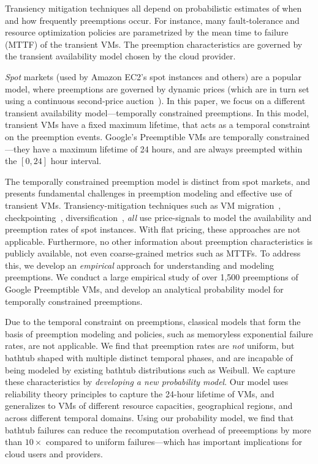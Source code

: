 Transiency mitigation techniques all depend on probabilistic estimates of when and how frequently preemptions occur.
%
For instance, many fault-tolerance and resource optimization policies are parametrized by the mean time to failure (MTTF) of the transient VMs. 
%
The preemption characteristics are governed by the transient availability model chosen by the cloud provider.


%
\emph{Spot} markets (used by Amazon EC2's spot instances and others) are a popular model, where preemptions are governed by dynamic prices (which are in turn set using a continuous second-price auction~\cite{spot-pricing2}). 
%
In this paper, we focus on a different transient availability model---temporally constrained preemptions.
%
In this model, transient VMs have a fixed maximum lifetime, that acts as a temporal constraint on the preemption events. 
%
Google's Preemptible VMs are temporally constrained---they have a maximum lifetime of 24 hours, and are always preempted within the $[0,24]$ hour interval.
%


The temporally constrained preemption model is distinct from spot markets, and presents fundamental challenges in preemption modeling and effective use of transient VMs. 
%
Transiency-mitigation techniques such as VM migration~\cite{spotcheck}, checkpointing~\cite{flint, marathe2014exploiting}, diversification~\cite{exosphere}, \emph{all} use price-signals to model the availability and preemption rates of spot instances. 
%
With flat pricing, these approaches are not applicable. 
%
Furthermore, no other information about preemption characteristics is publicly available, not even coarse-grained metrics such as MTTFs. 
%
To address this, we develop an \emph{empirical} approach for understanding and modeling preemptions. 
%
We conduct a large empirical study of over 1,500 preemptions of Google Preemptible VMs, and develop an analytical probability model for temporally constrained preemptions. 



%
Due to the temporal constraint on preemptions, classical models that form the basis of preemption modeling and policies, such as memoryless exponential failure rates, are not applicable. 
%
We find that preemption rates are \emph{not} uniform, but bathtub shaped with multiple distinct temporal phases, and are incapable of being modeled by existing bathtub distributions such as Weibull.
%
We capture these characteristics by \emph{developing a new probability model}. 
Our model uses reliability theory principles to capture the 24-hour lifetime of VMs, and generalizes to VMs of different resource capacities, geographical regions, and across different temporal domains.
%
Using our probability model, we find that bathtub failures can reduce the recomputation overhead of preeemptions by more than  $10\times$ compared to uniform failures---which has important implications for cloud users and providers. 


